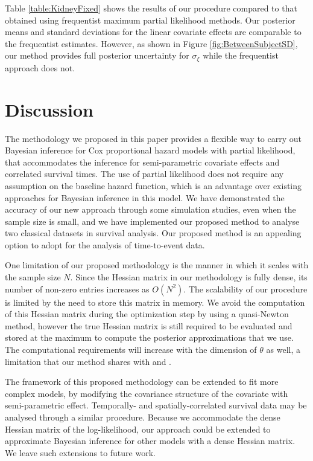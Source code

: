 \documentclass[ba]{imsart}
\begin{document}
Table \ref{table:KidneyFixed} shows the results of our procedure compared to that obtained using frequentist maximum partial likelihood methods. Our posterior means and standard deviations for the linear covariate effects are comparable to the frequentist estimates. However, as shown in Figure \ref{fig:BetweenSubjectSD}, our method provides full posterior uncertainty for $\sigma_{\xi}$ while the frequentist approach does not. 

\section{Discussion}\label{sec:discussion}

The methodology we proposed in this paper provides a flexible way to carry out Bayesian inference for Cox proportional hazard models with partial likelihood, that accommodates the inference for semi-parametric covariate effects and correlated survival times. The use of partial likelihood does not require any assumption on the baseline hazard function, which is an advantage over existing approaches for Bayesian inference in this model. We have demonstrated the accuracy of our new approach through some simulation studies, even when the sample size is small, and we have implemented our proposed method to analyse two classical datasets in survival analysis. Our proposed method is an appealing option to adopt for the analysis of time-to-event data.

One limitation of our proposed methodology is the manner in which it scales with the sample size $N$. Since the Hessian matrix in our methodology is fully dense, its number of non-zero entries increases as $O(N^{2})$. The scalability of our procedure is limited by the need to store this matrix in memory. We avoid the computation of this Hessian matrix during the optimization step by using a quasi-Newton method, however the true Hessian matrix is still required to be evaluated and stored at the maximum to compute the posterior approximations that we use. The computational requirements will increase with the dimension of $\theta$ as well, a limitation that our method shares with \citet{inla} and \cite{casecross}.

The framework of this proposed methodology can be extended to fit more complex models, by modifying the covariance structure of the covariate with semi-parametric effect. Temporally- and spatially-correlated survival data may be analysed through a similar procedure. Because we accommodate the dense Hessian matrix of the log-likelihood, our approach could be extended to approximate Bayesian inference for other models with a dense Hessian matrix. We leave such extensions to future work.
\end{document}
